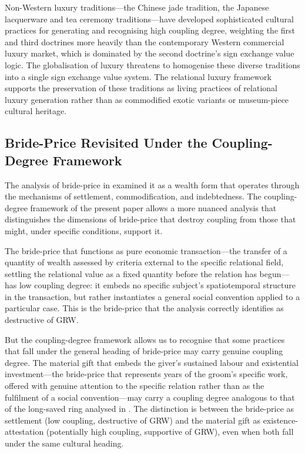 \begin{claim}
Non-Western luxury traditions---the Chinese jade tradition, the Japanese lacquerware and tea ceremony traditions---have developed sophisticated cultural practices for generating and recognising high coupling degree, weighting the first and third doctrines more heavily than the contemporary Western commercial luxury market, which is dominated by the second doctrine's sign exchange value logic. The globalisation of luxury threatens to homogenise these diverse traditions into a single sign exchange value system. The relational luxury framework supports the preservation of these traditions as living practices of relational luxury generation rather than as commodified exotic variants or museum-piece cultural heritage.
\end{claim}

\subsection{Bride-Price Revisited Under the Coupling-Degree Framework}
\label{p16:subsec:brideprice_revisited}

\noindent
The analysis of bride-price in  \parencite{paperxv} examined it as a wealth form that operates through the mechanisms of settlement, commodification, and indebtedness. The coupling-degree framework of the present paper allows a more nuanced analysis that distinguishes the dimensions of bride-price that destroy coupling from those that might, under specific conditions, support it.

The bride-price that functions as pure economic transaction---the transfer of a quantity of wealth assessed by criteria external to the specific relational field, settling the relational value as a fixed quantity before the relation has begun---has low coupling degree: it embeds no specific subject's spatiotemporal structure in the transaction, but rather instantiates a general social convention applied to a particular case. This is the bride-price that the  analysis correctly identifies as destructive of GRW.

But the coupling-degree framework allows us to recognise that some practices that fall under the general heading of bride-price may carry genuine coupling degree. The material gift that embeds the giver's sustained labour and existential investment---the bride-price that represents years of the groom's specific work, offered with genuine attention to the specific relation rather than as the fulfilment of a social convention---may carry a coupling degree analogous to that of the long-saved ring analysed in . The distinction is between the bride-price as settlement (low coupling, destructive of GRW) and the material gift as existence-attestation (potentially high coupling, supportive of GRW), even when both fall under the same cultural heading.

